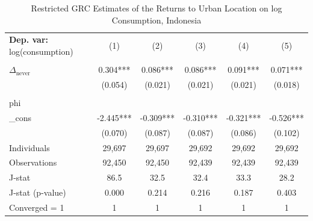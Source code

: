 \begin{table}[htbp] \centering \begin{threeparttable}
 \caption{Restricted GRC Estimates of the Returns to Urban Location on log Consumption, Indonesia} 
 \label{tab:GRC_IDN_consumption_urban_unb} 
\begin{tabular}{l ccccc} \toprule  \textbf{Dep. var:}  log(consumption) 
                    &\multicolumn{1}{c}{(1)}   &\multicolumn{1}{c}{(2)}   &\multicolumn{1}{c}{(3)}   &\multicolumn{1}{c}{(4)}   &\multicolumn{1}{c}{(5)}   \\
                    &               &               &               &               &               \\
\addlinespace
$\Delta_{\text{never}}$&       0.304***&       0.086***&       0.086***&       0.091***&       0.071***\\
                    &     (0.054)   &     (0.021)   &     (0.021)   &     (0.021)   &     (0.018)   \\
                    &               &               &               &               &               \\
\addlinespace
phi                 &               &               &               &               &               \\
_cons               &      -2.445***&      -0.309***&      -0.310***&      -0.321***&      -0.526***\\
                    &     (0.070)   &     (0.087)   &     (0.087)   &     (0.086)   &     (0.102)   \\
\addlinespace
Individuals         &      29,697   &      29,697   &      29,692   &      29,692   &      29,692   \\
Observations        &      92,450   &      92,450   &      92,439   &      92,439   &      92,439   \\
J-stat              &        86.5   &        32.5   &        32.4   &        33.3   &        28.2   \\
J-stat (p-value)    &       0.000   &       0.214   &       0.216   &       0.187   &       0.403   \\
Converged = 1       &           1   &           1   &           1   &           1   &           1   \\

\end{tabular}
\end{threeparttable}
\end{table}

